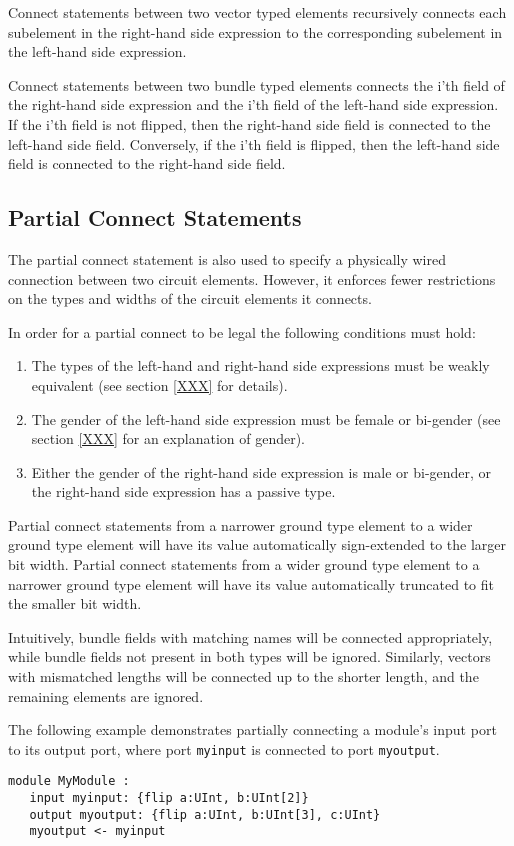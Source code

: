 \documentclass[12pt]{article}
\begin{document}
Connect statements between two vector typed elements recursively connects each subelement in the right-hand side expression to the corresponding subelement in the left-hand side expression. 

Connect statements between two bundle typed elements connects the i'th field of the right-hand side expression and the i'th field of the left-hand side expression. If the i'th field is not flipped, then the right-hand side field is connected to the left-hand side field. Conversely, if the i'th field is flipped, then the left-hand side field is connected to the right-hand side field.

\subsection{Partial Connect Statements}
The partial connect statement is also used to specify a physically wired connection between two circuit elements. However, it enforces fewer restrictions on the types and widths of the circuit elements it connects. 

In order for a partial connect to be legal the following conditions must hold:
\begin{enumerate}
\item The types of the left-hand and right-hand side expressions must be weakly equivalent (see section \ref{XXX} for details).
\item The gender of the left-hand side expression must be female or bi-gender (see section \ref{XXX} for an explanation of gender).
\item Either the gender of the right-hand side expression is male or bi-gender, or the right-hand side expression has a passive type.
\end{enumerate}

Partial connect statements from a narrower ground type element to a wider ground type element will have its value automatically sign-extended to the larger bit width. Partial connect statements from a wider ground type element to a narrower ground type element will have its value automatically truncated to fit the smaller bit width. 

Intuitively, bundle fields with matching names will be connected appropriately, while bundle fields not present in both types will be ignored. Similarly, vectors with mismatched lengths will be connected up to the shorter length, and the remaining elements are ignored.

The following example demonstrates partially connecting a module's input port to its output port, where port \verb|myinput| is connected to port \verb|myoutput|.
\begin{verbatim}
module MyModule :
   input myinput: {flip a:UInt, b:UInt[2]}
   output myoutput: {flip a:UInt, b:UInt[3], c:UInt}
   myoutput <- myinput
\end{verbatim}
\end{document}
